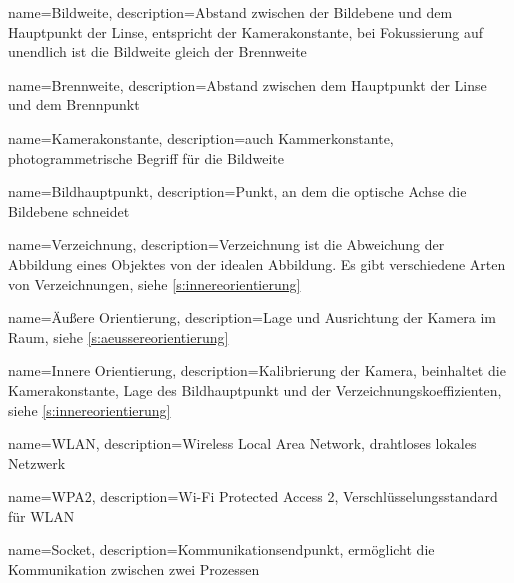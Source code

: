 
{
    name=Bildweite,
    description={Abstand zwischen der Bildebene und dem Hauptpunkt der Linse, entspricht der \Gls{Kamerakonstante}, bei Fokussierung auf unendlich ist die Bildweite gleich der \Gls{Brennweite}}
}

{
    name=Brennweite,
    description={Abstand zwischen dem Hauptpunkt der Linse und dem Brennpunkt}
}

{
    name=Kamerakonstante,
    description={auch Kammerkonstante, photogrammetrische Begriff für die Bildweite}
}

{
    name=Bildhauptpunkt,
    description={Punkt, an dem die optische Achse die Bildebene schneidet}
}

{
    name=Verzeichnung,
    description={Verzeichnung ist die Abweichung der Abbildung eines Objektes von der idealen Abbildung. Es gibt verschiedene Arten von Verzeichnungen, siehe \autoref{s:innereorientierung}
        }
}

{
    name=Äußere Orientierung,
    description={Lage und Ausrichtung der Kamera im Raum, siehe \autoref{s:aeussereorientierung}}
}

{
    name=Innere Orientierung,
    description={Kalibrierung der Kamera, beinhaltet die \Gls{Kamerakonstante}, Lage des \Gls{Bildhauptpunkt} und der Verzeichnungskoeffizienten, siehe \autoref{s:innereorientierung}}
}


{
    name=WLAN,
    description={Wireless Local Area Network, drahtloses lokales Netzwerk}
}

{
    name=WPA2,
    description={Wi-Fi Protected Access 2, Verschlüsselungsstandard für \Gls{WLAN}}
}

{
    name=Socket,
    description={Kommunikationsendpunkt, ermöglicht die Kommunikation zwischen zwei Prozessen}
}



